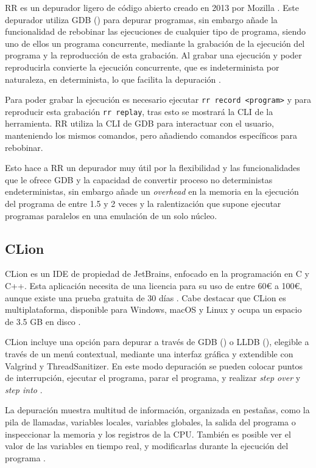 RR es un \gls{depurador} ligero de \gls{código abierto} creado en 2013 por Mozilla \cite{RRWiki}. Este depurador utiliza GDB () para \gls{depurar} programas, sin embargo añade la funcionalidad de rebobinar las ejecuciones de cualquier tipo de programa, siendo uno de ellos un \gls{programa concurrente}, mediante la grabación de la ejecución del programa y la reproducción de esta grabación. Al grabar una ejecución y poder reproducirla convierte la ejecución concurrente, que es \gls{indeterminista} por naturaleza, en \gls{determinista}, lo que facilita la depuración \cite{RR}.

Para poder grabar la ejecución es necesario ejecutar \texttt{rr record <program>} y para reproducir esta grabación \texttt{rr replay}, tras esto se mostrará la \gls{CLI} de la herramienta. RR utiliza la \gls{CLI} de GDB para interactuar con el usuario, manteniendo los mismos comandos, pero añadiendo comandos específicos para rebobinar.

Esto hace a RR un \gls{depurador} muy útil por la flexibilidad y las funcionalidades que le ofrece GDB y la capacidad de convertir \gls{proceso} no deterministas en\glspl{determinista}, sin embargo añade un \textit{\gls{overhead}} en la memoria en la ejecución del programa de entre 1.5 y 2 veces y la ralentización que supone ejecutar programas paralelos en una emulación de un solo núcleo\cite{RR}.

\subsection{CLion}{\label{subsec:clion}}
CLion es un \gls{IDE} de propiedad de JetBrains, enfocado en la programación en C y C++. Esta aplicación necesita de una licencia para su uso de entre 60€ a 100€, aunque existe una prueba gratuita de 30 días \cite{ClionPrizing}. Cabe destacar que CLion es multiplataforma, disponible para Windows, macOS y Linux y ocupa un espacio de 3.5 GB en disco \cite{ClionDownload}.

CLion incluye una opción para depurar a través de GDB () o LLDB (), elegible a través de un menú contextual, mediante una \gls{interfaz gráfica} y extendible con Valgrind y ThreadSanitizer. En este modo depuración se pueden colocar puntos de interrupción, ejecutar el programa, parar el programa, y realizar \textit{\gls{step over}} y \textit{\gls{step into}} \cite{ClionDebugger}.

La depuración muestra multitud de información, organizada en pestañas, como la pila de llamadas, variables locales, variables globales, la salida del programa o inspeccionar la memoria y los \gls{registros} de la \gls{CPU}. También es posible ver el valor de las variables en tiempo real, y modificarlas durante la ejecución del programa \cite{ClionDebuggerToolWindow}.

